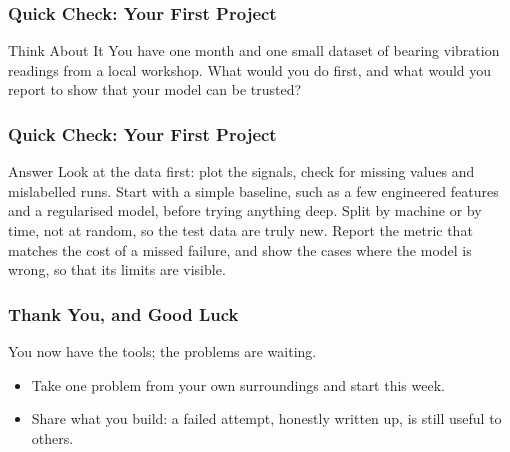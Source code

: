 \begin{frame}[fragile]\frametitle{Quick Check: Your First Project}
\begin{block}{Think About It}
You have one month and one small dataset of bearing vibration readings from a local workshop.
What would you do first, and what would you report to show that your model can be trusted?
\end{block}
\end{frame}

\begin{frame}[fragile]\frametitle{Quick Check: Your First Project}
\begin{block}{Answer}
Look at the data first: plot the signals, check for missing values and mislabelled runs.
Start with a simple baseline, such as a few engineered features and a regularised model,
before trying anything deep. Split by machine or by time, not at random, so the test data
are truly new. Report the metric that matches the cost of a missed failure, and show the
cases where the model is wrong, so that its limits are visible.
\end{block}
\end{frame}

\begin{frame}[fragile]\frametitle{Thank You, and Good Luck}
\begin{center}
{\Large You now have the tools; the problems are waiting.}
\end{center}
\begin{itemize}
\item Take one problem from your own surroundings and start this week.
\item Share what you build: a failed attempt, honestly written up, is still useful to others.
\end{itemize}
\end{frame}
